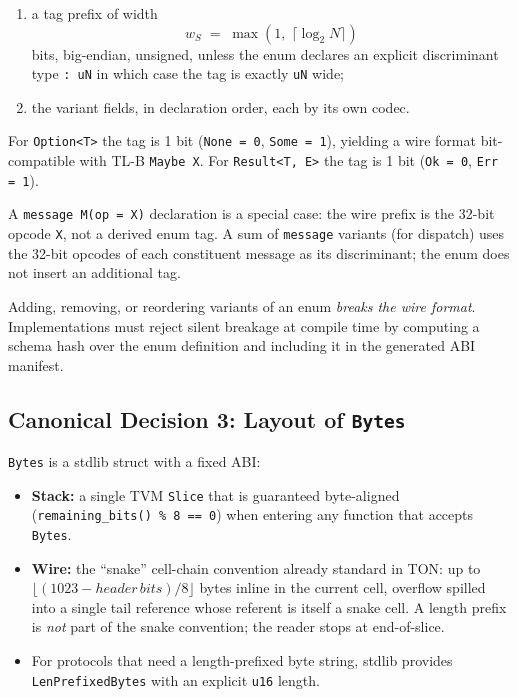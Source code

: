 \documentclass[12pt,oneside]{article}
\begin{document}
\begin{enumerate}
\item a tag prefix of width
\[
w_S \;=\; \max\!\left(1,\; \lceil \log_2 N \rceil\right)
\]
bits, big-endian, unsigned, unless the enum declares an explicit discriminant
type \verb|: uN| in which case the tag is exactly \verb|uN| wide;
\item the variant fields, in declaration order, each by its own codec.
\end{enumerate}

For \verb|Option<T>| the tag is 1 bit (\verb|None = 0|, \verb|Some = 1|),
yielding a wire format bit-compatible with TL-B \verb|Maybe X|.
For \verb|Result<T, E>| the tag is 1 bit (\verb|Ok = 0|, \verb|Err = 1|).

A \verb|message M(op = X)| declaration is a special case: the wire prefix is
the 32-bit opcode \verb|X|, not a derived enum tag. A sum of \verb|message|
variants (for dispatch) uses the 32-bit opcodes of each constituent message
as its discriminant; the enum does not insert an additional tag.

Adding, removing, or reordering variants of an enum \emph{breaks the wire
format}. Implementations must reject silent breakage at compile time by
computing a schema hash over the enum definition and including it in the
generated ABI manifest.

\subsection{Canonical Decision 3: Layout of \texttt{Bytes}}
\label{sec:cd-bytes}
\verb|Bytes| is a stdlib struct with a fixed ABI:

\begin{itemize}
\item \textbf{Stack:} a single TVM \verb|Slice| that is guaranteed
byte-aligned (\verb|remaining_bits() % 8 == 0|) when entering any function
that accepts \verb|Bytes|.
\item \textbf{Wire:} the ``snake'' cell-chain convention already standard in
TON: up to $\lfloor (1023 - \mathit{header\,bits}) / 8 \rfloor$ bytes inline
in the current cell, overflow spilled into a single tail reference whose
referent is itself a snake cell. A length prefix is \emph{not} part of the
snake convention; the reader stops at end-of-slice.
\item For protocols that need a length-prefixed byte string, stdlib provides
\verb|LenPrefixedBytes| with an explicit \verb|u16| length.
\end{itemize}
\end{document}

